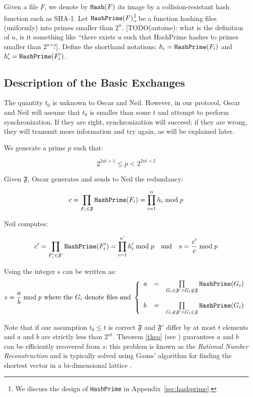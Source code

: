 \documentclass[11pt]{llncs}
\begin{document}
Given a file $F$, we denote by $\mbox{{\tt Hash}}(F)$ its image by a
collision-resistant hash function such as SHA-1. Let $\mbox{{\tt
HashPrime}}(F)$\footnote{We discuss the design of \mbox{{\tt HashPrime}} in
Appendix~\ref{sec:hashprime}.} be a function hashing files (uniformly) into
primes smaller than $2^u$. [TODO(antoine): what is the definition of $u$, is it
something like ``there exists $u$ such that HashPrime hashes to primes smaller
than $2^u$''?]. Define the shorthand notations: $h_i=\mbox{{\tt
HashPrime}}(F_i)$ and $h'_i=\mbox{{\tt HashPrime}}(F'_i)$.\smallskip

\subsection{Description of the Basic Exchanges}
\label{basic}

The quantity $t_0$ is unknown to Oscar and Neil. However, in our protocol, Oscar
and Neil will assume that $t_0$ is smaller than some $t$ and attempt to perform
synchronization. If they are right, synchronization will succeed; if they are
wrong, they will transmit more information and try again, as will be explained
later.

We generate a prime $p$ such that:

\begin{equation}
\label{equp}
2^{2ut+1} \leq p < 2^{2ut+2}
\end{equation}

Given $\mathfrak{F}$, Oscar generates and sends to Neil the redundancy:

$$
c=\prod_{F_i\in \mathfrak{F}} \mbox{{\tt HashPrime}}(F_i)=\prod_{i=1}^n h_i \bmod p
$$

Neil computes:\smallskip

$$c'=\prod_{F'_i\in \mathfrak{F'}} \mbox{{\tt HashPrime}}(F'_i)=\prod_{i=1}^{n'} h'_i \bmod p{~~~\mbox{and}~~~}s=\frac{c'}{c} \bmod p$$

Using \cite{vallee} the integer $s$ can be written as:
$$s=\frac{a}{b} \bmod p{\mbox{~where the~}G_i\mbox{~denote files and~}}
\left\{
\begin{array}{lcr}
a & =&  \prod\limits_{G_i \in \mathfrak{F}'\wedge G_i \not\in\mathfrak{F}} \mbox{{\tt HashPrime}}(G_i) \\
\\
b & = & \prod\limits_{G_i \not\in\mathfrak{F}' \wedge G_i \in\mathfrak{F}} \mbox{{\tt HashPrime}}(G_i)
\end{array}
\right.
$$

Note that if our assumption $t_0 \leq t$ is correct $\mathfrak{F}$ and
$\mathfrak{F}'$ differ by at most $t$ elements and $a$ and $b$ are strictly less
than $2^{ut}$. Theorem \ref{theo} (see \cite{cryptorational}) guarantees $a$ and
$b$ can be efficiently recovered from $s$: this problem is known as the {\sl
Rational Number Reconstruction} \cite{pan2004rational,wang2003acceleration} and
is typically solved using Gauss' algorithm for finding the shortest vector in a
bi-dimensional lattice \cite{vallee}.
\end{document}
